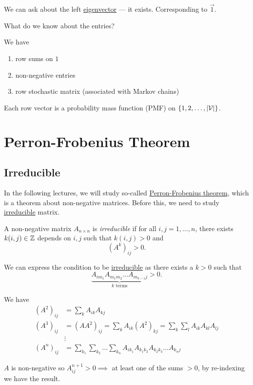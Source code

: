 We can ask about the left \hyperref[def:eigenvector]{eigenvector} — it exists. Corresponding to \(\vec{1}\).
\begin{problem}
What do we know about the entries?
\end{problem}
\begin{answer}
	We have
	\begin{enumerate}
		\item row sums on \(1\)
		\item non-negative entries
		\item row stochastic matrix (associated with Markov chains)
	\end{enumerate}
\end{answer}

\begin{remark}
	Each row vector is a probability mass function (PMF) on \(\{1, 2, \ldots , \left\vert \mathcal{\MakeUppercase{v}}  \right\vert \}\).
\end{remark}

\section{Perron-Frobenius Theorem}
\subsection{Irreducible}
In the following lectures, we will study so-called \hyperref[thm:Perron-Frobenius-theorem]{Perron-Frobenius theorem}, which is a theorem about non-negative matrices.
Before this, we need to study \hyperref[def:irreducible]{irreducible} matrix.

\begin{definition}[Irreducible]\label{def:irreducible}
	A non-negative matrix \(A_{n\times n}\) is \emph{irreducible} if for all \(i, j = 1, \ldots , n\), there exists \(k(i, j)\in \mathbb{\MakeUppercase{z}} \)
	depends on \(i, j\) such that \(k(i, j) > 0\) and
	\[
		(A^k)_{ij}>0.
	\]
\end{definition}

\begin{remark}
	We can express the condition to be \hyperref[def:irreducible]{irreducible} as there exists a \(k > 0\) such that
	\[
		\underbrace{A_{im_1} A_{m_{1}m_2} \ldots A_{m_{k-1}j}}_{k\text{ terms}}>0.
	\]
\end{remark}
\begin{explanation}
	We have
	\[
		\begin{split}
			(A^2)_{ij} &= \sum\limits_{k} A_{ik}A_{kj}\\
			(A^3)_{ij} &= (A A^2)_{ij} = \sum\limits_{k} A_{ik}(A^2)_{kj} = \sum\limits_{k}\sum\limits_{l} A_{ik} A_{kl}A_{lj}\\
			&\vdots\\
			(A^n)_{ij} &= \sum\limits_{k_1}\sum\limits_{k_2}\ldots \sum\limits_{k_n}A_{ik_1}A_{k_1 k_2}A_{k_2 k_3}\ldots A_{k_n j}
		\end{split}
	\]

	\(A\) is non-negative so \(A^{n+1}_{ij} > 0\implies \) at least one of the sums \(>0\), by re-indexing we have the result.
\end{explanation}

